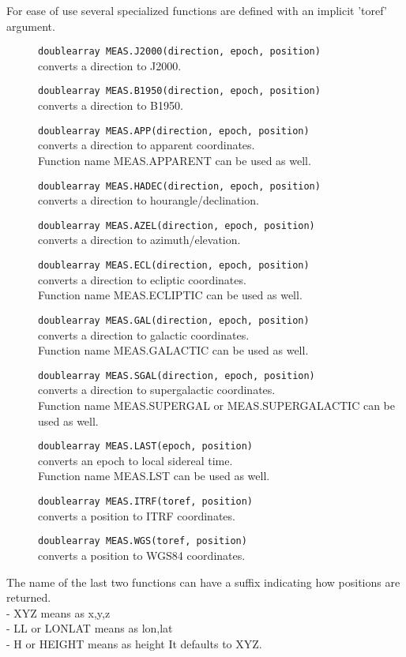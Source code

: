 For ease of use several specialized functions are defined with an implicit
'toref' argument.
\begin{description}
  \item[] \texttt{doublearray MEAS.J2000(direction, epoch, position)}\\
    converts a direction to J2000.
  \item[] \texttt{doublearray MEAS.B1950(direction, epoch, position)}\\
    converts a direction to B1950.
  \item[] \texttt{doublearray MEAS.APP(direction, epoch, position)}\\
    converts a direction to apparent coordinates.
    \\Function name MEAS.APPARENT can be used as well.
  \item[] \texttt{doublearray MEAS.HADEC(direction, epoch, position)}\\
    converts a direction to hourangle/declination.
  \item[] \texttt{doublearray MEAS.AZEL(direction, epoch, position)}\\
    converts a direction to azimuth/elevation.
  \item[] \texttt{doublearray MEAS.ECL(direction, epoch, position)}\\
    converts a direction to ecliptic coordinates.
    \\Function name MEAS.ECLIPTIC can be used as well.
  \item[] \texttt{doublearray MEAS.GAL(direction, epoch, position)}\\
    converts a direction to galactic coordinates.
    \\Function name MEAS.GALACTIC can be used as well.
  \item[] \texttt{doublearray MEAS.SGAL(direction, epoch, position)}\\
    converts a direction to supergalactic coordinates.
    \\Function name MEAS.SUPERGAL or MEAS.SUPERGALACTIC can be used as well.
  \item[] \texttt{doublearray MEAS.LAST(epoch, position)}\\
    converts an epoch to local sidereal time.
    \\Function name MEAS.LST can be used as well.
  \item[] \texttt{doublearray MEAS.ITRF(toref, position)}\\
    converts a position to ITRF coordinates.
  \item[] \texttt{doublearray MEAS.WGS(toref, position)}\\
    converts a position to WGS84 coordinates.
\end{description}
The name of the last two functions can have a suffix indicating how
positions are returned.
\\- XYZ means as x,y,z
\\- LL or LONLAT means as lon,lat
\\- H or HEIGHT means as height
It defaults to XYZ.

